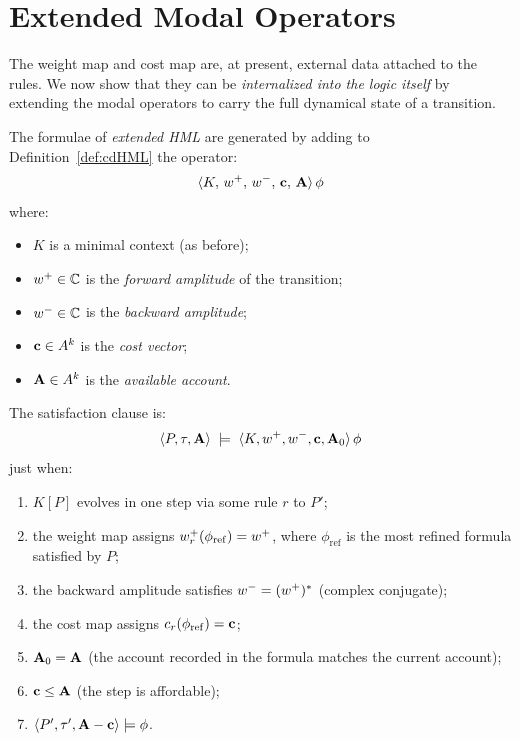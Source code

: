 \chapter{Extended Modal Operators}
\label{sec:extended-modal}

The weight map and cost map are, at present, external data attached to the
rules.  We now show that they can be \emph{internalized into the logic itself}
by extending the modal operators to carry the full dynamical state of a
transition.

\begin{definition}
\label{def:ext-modal}
The formulae of \emph{extended HML} are generated by adding to
Definition~\ref{def:cdHML} the operator:
\[
  \langle K,\, w^{+},\, w^{-},\, \mathbf{c},\, \mathbf{A} \rangle\,\phi
\]
where:
\begin{itemize}[itemsep=2pt]
  \item $K$ is a minimal context (as before);
  \item $w^{+} \in \mathbb{C}$ is the \emph{forward amplitude} of the transition;
  \item $w^{-} \in \mathbb{C}$ is the \emph{backward amplitude};
  \item $\mathbf{c} \in A^k$ is the \emph{cost vector};
  \item $\mathbf{A} \in A^k$ is the \emph{available account}.
\end{itemize}
The satisfaction clause is:
\[
  \langle P, \tau, \mathbf{A} \rangle \;\models\;
  \langle K, w^{+}, w^{-}, \mathbf{c}, \mathbf{A}_0 \rangle\,\phi
\]
just when:
\begin{enumerate}[label=(\roman*)]
  \item $K[P]$ evolves in one step via some rule $r$ to $P'$;
  \item the weight map assigns $w^{+}_r(\phi_{\mathrm{ref}}) = w^{+}$, where
        $\phi_{\mathrm{ref}}$ is the most refined formula satisfied by $P$;
  \item the backward amplitude satisfies $w^{-} = (w^{+})^*$ (complex conjugate);
  \item the cost map assigns $c_r(\phi_{\mathrm{ref}}) = \mathbf{c}$;
  \item $\mathbf{A}_0 = \mathbf{A}$ (the account recorded in the formula matches
        the current account);
  \item $\mathbf{c} \leq \mathbf{A}$ (the step is affordable);
  \item $\langle P', \tau', \mathbf{A} - \mathbf{c} \rangle \models \phi$.
\end{enumerate}
\end{definition}

